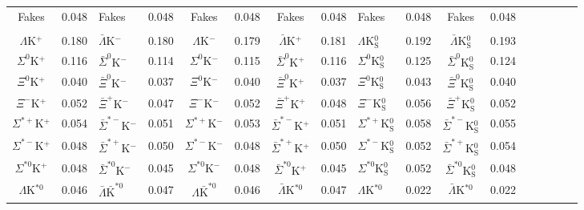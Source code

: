 \documentclass[ALICE,manyauthors]{cernphprep}
\begin{document}
\begin{landscape}
\begin{table}[htbp]
{\begin{tabular}{|c|cV{5.0}c|cV{5.0}c|cV{5.0}c|cV{5.0}c|cV{5.0}c|c|}
  Fakes & 0.048 & Fakes & 0.048 & Fakes & 0.048 & Fakes & 0.048 & Fakes & 0.048 & Fakes & 0.048 \\
  
   \\
  $\Lambda$K$^{+}$ & 0.180 & $\bar{\Lambda}$K$^{-}$ & 0.180 & $\Lambda$K$^{-}$ & 0.179 & $\bar{\Lambda}$K$^{+}$ & 0.181 & $\Lambda$K$^{0}_{\mathrm{S}}$ & 0.192 & $\bar{\Lambda}$K$^{0}_{\mathrm{S}}$ & 0.193 \\
  
  $\Sigma^{0}$K$^{+}$ & 0.116 & $\bar{\Sigma}^{0}$K$^{-}$ & 0.114 & $\Sigma^{0}$K$^{-}$ & 0.115 & $\bar{\Sigma}^{0}$K$^{+}$ & 0.116 & $\Sigma^{0}$K$^{0}_{\mathrm{S}}$ & 0.125 & $\bar{\Sigma}^{0}$K$^{0}_{\mathrm{S}}$ & 0.124 \\
  
  $\Xi^{0}$K$^{+}$ & 0.040 & $\bar{\Xi}^{0}$K$^{-}$ & 0.037 & $\Xi^{0}$K$^{-}$ & 0.040 & $\bar{\Xi}^{0}$K$^{+}$ & 0.037 & $\Xi^{0}$K$^{0}_{\mathrm{S}}$ & 0.043 & $\bar{\Xi}^{0}$K$^{0}_{\mathrm{S}}$ & 0.040 \\
  
  $\Xi^{-}$K$^{+}$ & 0.052 & $\bar{\Xi}^{+}$K$^{-}$ & 0.047 & $\Xi^{-}$K$^{-}$ & 0.052 & $\bar{\Xi}^{+}$K$^{+}$ & 0.048 & $\Xi^{-}$K$^{0}_{\mathrm{S}}$ & 0.056 & $\bar{\Xi}^{+}$K$^{0}_{\mathrm{S}}$ & 0.052 \\
  
  $\Sigma^{*+}$K$^{+}$ & 0.054 & $\bar{\Sigma}^{*-}$K$^{-}$ & 0.051 & $\Sigma^{*+}$K$^{-}$ & 0.053 & $\bar{\Sigma}^{*-}$K$^{+}$ & 0.051 & $\Sigma^{*+}$K$^{0}_{\mathrm{S}}$ & 0.058 & $\bar{\Sigma}^{*-}$K$^{0}_{\mathrm{S}}$ & 0.055 \\
  
  $\Sigma^{*-}$K$^{+}$ & 0.048 & $\bar{\Sigma}^{*+}$K$^{-}$ & 0.050 & $\Sigma^{*-}$K$^{-}$ & 0.048 & $\bar{\Sigma}^{*+}$K$^{+}$ & 0.050 & $\Sigma^{*-}$K$^{0}_{\mathrm{S}}$ & 0.052 & $\bar{\Sigma}^{*+}$K$^{0}_{\mathrm{S}}$ & 0.054 \\
  
  $\Sigma^{*0}$K$^{+}$ & 0.048 & $\bar{\Sigma}^{*0}$K$^{-}$ & 0.045 & $\Sigma^{*0}$K$^{-}$ & 0.048 & $\bar{\Sigma}^{*0}$K$^{+}$ & 0.045 & $\Sigma^{*0}$K$^{0}_{\mathrm{S}}$ & 0.052 & $\bar{\Sigma}^{*0}$K$^{0}_{\mathrm{S}}$ & 0.048 \\
  
  $\Lambda$K$^{*0}$ & 0.046 & $\bar{\Lambda}\bar{\mathrm{K}}^{*0}$ & 0.047 & $\Lambda\bar{\mathrm{K}}^{*0}$ & 0.046 & $\bar{\Lambda}$K$^{*0}$ & 0.047 & $\Lambda$K$^{*0}$ & 0.022 & $\bar{\Lambda}$K$^{*0}$ & 0.022 \\
  

\end{tabular}}
\end{table}
\end{landscape}
\end{document}
